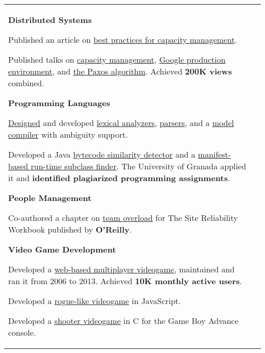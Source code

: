 \documentclass[letterpaper,10pt,oneside]{article}
\newcommand{\itemspacingtwo}{\vspace{0.04cm}}
\newenvironment{body}
{\par\par
\begin{longtable}{p{0.145\textwidth}p{0.81\textwidth}}}
{\par\end{longtable}\par}
\begin{document}
\begin{body}
\textbf{Distributed Systems}
\begin{comp}
\item Published an article on \href{https://static.googleusercontent.com/media/sre.google/en//static/pdf/login\_winter20\_10\_torres.pdf}{best practices for capacity management}.
\item Published talks on \href{https://youtu.be/pOo0oKNM9I8}{capacity management}, \href{https://youtu.be/dhTVVWzpc4Q}{Google production environment}, and \href{https://youtu.be/d7nAGI\_NZPk}{the Paxos algorithm}.
   \newline Achieved \textbf{200K views} combined.
\end{comp}
\itemspacingtwo

\textbf{Programming Languages}
\begin{comp}
\item \href{https://www.worldscientific.com/doi/abs/10.1142/S0218194014500375}{Designed} and developed \href{https://github.com/lquesada/ModelCC/tree/master/ModelCC/src/org/modelcc/lexer}{lexical analyzers}, \href{https://github.com/lquesada/ModelCC/tree/master/ModelCC/src/org/modelcc/parser}{parsers}, and a \href{https://github.com/lquesada/ModelCC}{model compiler} with ambiguity support.
\item Developed a Java \href{https://github.com/lquesada/JSimil}{bytecode similarity detector} and a \href{https://github.com/lquesada/RunTimeSubclassFinder}{manifest-based run-time subclass finder}.
  \newline The University of Granada applied it and \textbf{identified plagiarized programming assignments}.
\end{comp}
\itemspacingtwo

\textbf{People Management}
\begin{comp}
\item Co-authored a chapter on \href{https://landing.google.com/sre/workbook/chapters/overload/}{team overload} for The Site Reliability Workbook published by \textbf{O'Reilly}.
\end{comp}
\itemspacingtwo

\textbf{Video Game Development}
\begin{comp}
\item Developed a \href{https://github.com/lquesada/LifoSource}{web-based multiplayer videogame}, maintained and ran it from 2006 to 2013.
  \newline Achieved \textbf{10K monthly active users}.
\item Developed a \href{https://cavernal.github.io/cavernal}{rogue-like videogame} in JavaScript.
\item Developed a \href{https://github.com/lquesada/SpaceARMy}{shooter videogame} in C for the Game Boy Advance console.
\end{comp}
\itemspacingtwo


\end{body}
\end{document}
